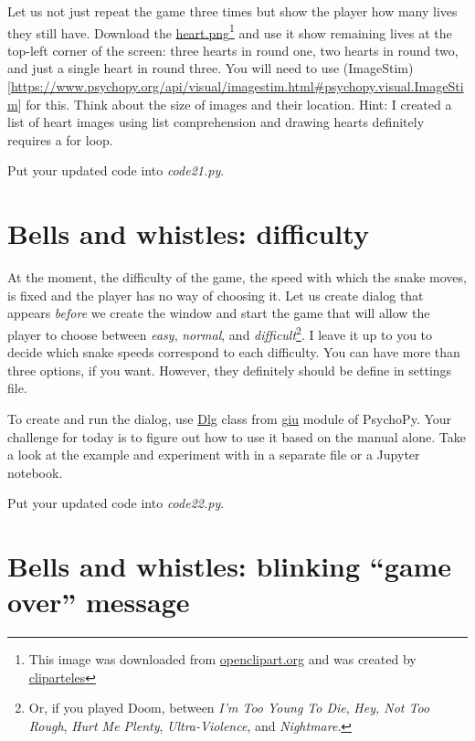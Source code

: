 \documentclass[
]{book}
\begin{document}
Let us not just repeat the game three times but show the player how many lives they still have. Download the \href{material/heart.png}{heart.png}\footnote{This image was downloaded from \href{https://openclipart.org/}{openclipart.org} and was created by \href{https://openclipart.org/artist/cliparteles}{cliparteles}} and use it show remaining lives at the top-left corner of the screen: three hearts in round one, two hearts in round two, and just a single heart in round three. You will need to use (ImageStim){[}\url{https://www.psychopy.org/api/visual/imagestim.html\#psychopy.visual.ImageStim}{]} for this. Think about the size of images and their location. Hint: I created a list of heart images using list comprehension and drawing hearts definitely requires a for loop.

Put your updated code into \emph{code21.py}.

\hypertarget{bells-and-whistles-difficulty}{%
\section{Bells and whistles: difficulty}\label{bells-and-whistles-difficulty}}

At the moment, the difficulty of the game, the speed with which the snake moves, is fixed and the player has no way of choosing it. Let us create dialog that appears \emph{before} we create the window and start the game that will allow the player to choose between \emph{easy}, \emph{normal}, and \emph{difficult}\footnote{Or, if you played Doom, between \emph{I'm Too Young To Die}, \emph{Hey, Not Too Rough}, \emph{Hurt Me Plenty}, \emph{Ultra-Violence}, and \emph{Nightmare}.}. I leave it up to you to decide which snake speeds correspond to each difficulty. You can have more than three options, if you want. However, they definitely should be define in settings file.

To create and run the dialog, use \href{https://www.psychopy.org/api/gui.html\#dlg}{Dlg} class from
\href{https://www.psychopy.org/api/gui.html}{giu} module of PsychoPy. Your challenge for today is to figure out how to use it based on the manual alone. Take a look at the example and experiment with in a separate file or a Jupyter notebook.

Put your updated code into \emph{code22.py}.

\hypertarget{bells-and-whistles-blinking-game-over-message}{%
\section{Bells and whistles: blinking ``game over'' message}\label{bells-and-whistles-blinking-game-over-message}}
\end{document}
